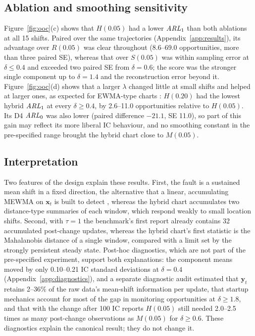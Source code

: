 \subsection{Ablation and smoothing sensitivity}

Figure~\ref{fig:ooc}(c) shows that $H(0.05)$ had a lower $\mathit{ARL}_1$ than both ablations at all 15
shifts. Paired over the same trajectories (Appendix~\ref{app:results}), its advantage over $R(0.05)$
was clear throughout (8.6--69.0 opportunities, more than three paired SE), whereas that over
$S(0.05)$ was within sampling error at $\delta\le0.4$ and exceeded
two paired SE from $\delta=0.6$; the score was the stronger single component up to $\delta=1.4$ and
the reconstruction error beyond it. Figure~\ref{fig:ooc}(d) shows that a larger $\lambda$ changed
little at small shifts and helped at larger ones, as expected for EWMA-type charts
\citep{lowry_multivariate_1992}: $H(0.20)$ had the lowest hybrid $\mathit{ARL}_1$ at every $\delta\ge0.4$, by
2.6--11.0 opportunities relative to $H(0.05)$. Its D4 $\mathit{ARL}_0$ was also lower (paired difference
$-21.1$, SE 11.0), so part of this gain may reflect its more liberal IC behaviour, and no
smoothing constant in the pre-specified range brought the hybrid chart close to $M(0.05)$.

\subsection{Interpretation}

Two features of the design explain these results. First, the fault is a sustained mean shift in a
fixed direction, the alternative that a linear, accumulating MEWMA on $\bm{x}_t$ is built to detect
\citep{lowry_multivariate_1992}, whereas the hybrid chart accumulates two distance-type summaries of each
window, which respond weakly to small location shifts. Second, with $\tau=1$ the benchmark's first
report already contains 32 accumulated post-change updates, whereas the hybrid chart's first statistic is
the Mahalanobis distance of a single window, compared with a limit set by the strongly persistent
steady state. Post-hoc diagnostics, which are not part of the pre-specified experiment, support both
explanations: the component means moved by only 0.10--0.21 IC standard deviations at
$\delta=0.4$ (Appendix~\ref{app:diagnostics}), and a separate diagnostic audit estimated that $\bm{y}_t$ retains 2--36\% of the raw data's mean-shift information per update, that startup mechanics account
for most of the gap in monitoring opportunities at $\delta\ge1.8$, and that with the change after 100 IC reports $H(0.05)$ still needed 2.0--2.5 times as many post-change observations as
$M(0.05)$ for $\delta\ge0.6$. These diagnostics explain the canonical result; they do not change it.
